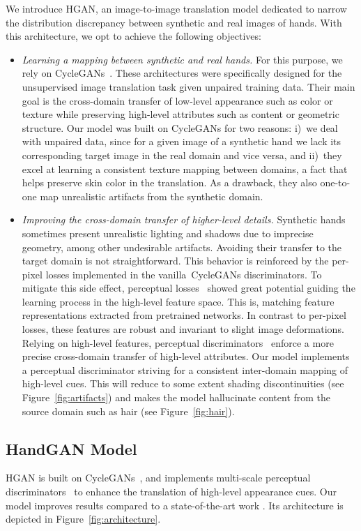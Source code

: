 We introduce \acf{HGAN}, an image-to-image translation model dedicated to narrow the distribution discrepancy between synthetic and real images of hands. With this architecture, we opt to achieve the following objectives:
\begin{itemize}
	\item \emph{Learning a mapping between synthetic and real hands.} For this purpose, we rely on \acp{CycleGAN}~\cite{Zhu2017}. These architectures were specifically designed for the unsupervised image translation task given unpaired training data. Their main goal is the cross-domain transfer of low-level appearance such as color or texture while preserving high-level attributes such as content or geometric structure. Our model was built on \acp{CycleGAN} for two reasons: i)~we deal with unpaired data, since for a given image of a synthetic hand we lack its corresponding target image in the real domain and vice versa, and ii)~they excel at learning a consistent texture mapping between domains, a fact that helps preserve skin color in the translation. As a drawback, they also one-to-one map unrealistic artifacts from the synthetic domain.
	
	\item \emph{Improving the cross-domain transfer of higher-level details.}
	Synthetic hands sometimes present unrealistic lighting and shadows due to imprecise geometry, among other undesirable artifacts. Avoiding their transfer to the target domain is not straightforward. This behavior is reinforced by the per-pixel losses implemented in the vanilla~\acp{CycleGAN} discriminators. To mitigate this side effect, perceptual losses~\cite{Johnson2016} showed great potential guiding the learning process in the high-level feature space. This is, matching feature representations extracted from pretrained networks. In contrast to per-pixel losses, these features are robust and invariant to slight image deformations. Relying on high-level features, perceptual discriminators~\cite{Sungatullina2018} enforce a more precise cross-domain transfer of high-level attributes. Our model implements a perceptual discriminator striving for a consistent inter-domain mapping of high-level cues. This will reduce to some extent shading discontinuities (see Figure~\ref{fig:artifacts}) and makes the model hallucinate content from the source domain such as hair (see Figure~\ref{fig:hair}).
\end{itemize}

\subsection{HandGAN Model}
\ac{HGAN} is built on \acp{CycleGAN}~\cite{Zhu2017}, and implements multi-scale perceptual discriminators~\cite{Sungatullina2018} to enhance the translation of high-level appearance cues. Our model improves results compared to a state-of-the-art work \cite{Mueller2017}. Its architecture is depicted in Figure~\ref{fig:architecture}.

